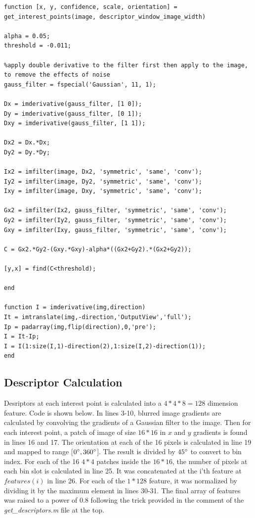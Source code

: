 \begin{lstlisting}[style=Matlab-editor]
function [x, y, confidence, scale, orientation] = get_interest_points(image, descriptor_window_image_width)

alpha = 0.05;
threshold = -0.011;

%apply double derivative to the filter first then apply to the image, to remove the effects of noise
gauss_filter = fspecial('Gaussian', 11, 1);

Dx = imderivative(gauss_filter, [1 0]);
Dy = imderivative(gauss_filter, [0 1]);
Dxy = imderivative(gauss_filter, [1 1]);

Dx2 = Dx.*Dx;
Dy2 = Dy.*Dy;

Ix2 = imfilter(image, Dx2, 'symmetric', 'same', 'conv');
Iy2 = imfilter(image, Dy2, 'symmetric', 'same', 'conv');
Ixy = imfilter(image, Dxy, 'symmetric', 'same', 'conv');

Gx2 = imfilter(Ix2, gauss_filter, 'symmetric', 'same', 'conv');
Gy2 = imfilter(Iy2, gauss_filter, 'symmetric', 'same', 'conv');
Gxy = imfilter(Ixy, gauss_filter, 'symmetric', 'same', 'conv');

C = Gx2.*Gy2-(Gxy.*Gxy)-alpha*((Gx2+Gy2).*(Gx2+Gy2));

[y,x] = find(C<threshold);

end

function I = imderivative(img,direction)
It = imtranslate(img,-direction,'OutputView','full');
Ip = padarray(img,flip(direction),0,'pre');
I = It-Ip;
I = I(1:size(I,1)-direction(2),1:size(I,2)-direction(1));
end
\end{lstlisting}

\subsection{Descriptor Calculation}
Desriptors at each interest point is calculated into a $4*4*8=128$ dimension feature. Code is shown below. In lines 3-10, blurred image gradients are calculated by convolving the gradients of a Gaussian filter to the image. Then for each interest point, a patch of image of size $16*16$ in $x$ and $y$ gradients is found in lines 16 and 17. The orientation at each of the 16 pixels is calculated in line 19 and mapped to range [$0\degree, 360\degree$]. The result is divided by $45\degree$ to convert to bin index. For each of the 16 $4*4$ patches inside the $16*16$, the number of pixels at each bin slot is calculated in line 25. It was concatenated at the i'th feature at $features(i)$ in line 26. For each of the $1*128$ feature, it was normalized by dividing it by the maximum element in lines 30-31. The final array of features was raised to a power of $0.8$ following the trick provided in the comment of the \emph{get\_descriptors.m} file at the top.

